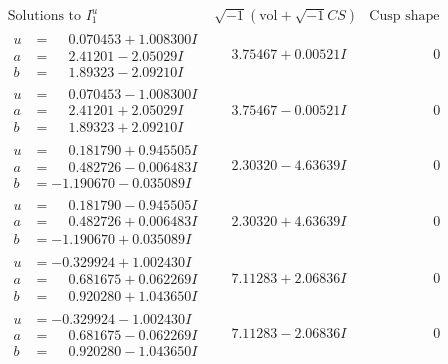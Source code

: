 \documentclass[1p]{elsarticle_modified}
\theoremstyle{definition}
\newcommand{\I}{\sqrt{-1}}
\begin{document}
$$\begin{array}{c|c|c}  
\text{Solutions to }I^u_{1}& \I (\text{vol} + \sqrt{-1}CS) & \text{Cusp shape}\\
 \hline 
\begin{aligned}
u &= \phantom{-}0.070453 + 1.008300 I \\
a &= \phantom{-}2.41201 - 2.05029 I \\
b &= \phantom{-}1.89323 - 2.09210 I\end{aligned}
 & \phantom{-}3.75467 + 0.00521 I & \phantom{-0.000000 } 0 \\ \hline\begin{aligned}
u &= \phantom{-}0.070453 - 1.008300 I \\
a &= \phantom{-}2.41201 + 2.05029 I \\
b &= \phantom{-}1.89323 + 2.09210 I\end{aligned}
 & \phantom{-}3.75467 - 0.00521 I & \phantom{-0.000000 } 0 \\ \hline\begin{aligned}
u &= \phantom{-}0.181790 + 0.945505 I \\
a &= \phantom{-}0.482726 - 0.006483 I \\
b &= -1.190670 - 0.035089 I\end{aligned}
 & \phantom{-}2.30320 - 4.63639 I & \phantom{-0.000000 } 0 \\ \hline\begin{aligned}
u &= \phantom{-}0.181790 - 0.945505 I \\
a &= \phantom{-}0.482726 + 0.006483 I \\
b &= -1.190670 + 0.035089 I\end{aligned}
 & \phantom{-}2.30320 + 4.63639 I & \phantom{-0.000000 } 0 \\ \hline\begin{aligned}
u &= -0.329924 + 1.002430 I \\
a &= \phantom{-}0.681675 + 0.062269 I \\
b &= \phantom{-}0.920280 + 1.043650 I\end{aligned}
 & \phantom{-}7.11283 + 2.06836 I & \phantom{-0.000000 } 0 \\ \hline\begin{aligned}
u &= -0.329924 - 1.002430 I \\
a &= \phantom{-}0.681675 - 0.062269 I \\
b &= \phantom{-}0.920280 - 1.043650 I\end{aligned}
 & \phantom{-}7.11283 - 2.06836 I & \phantom{-0.000000 } 0 \\ \hline\begin{aligned}

\end{aligned}
\end{array}$$
\end{document}
